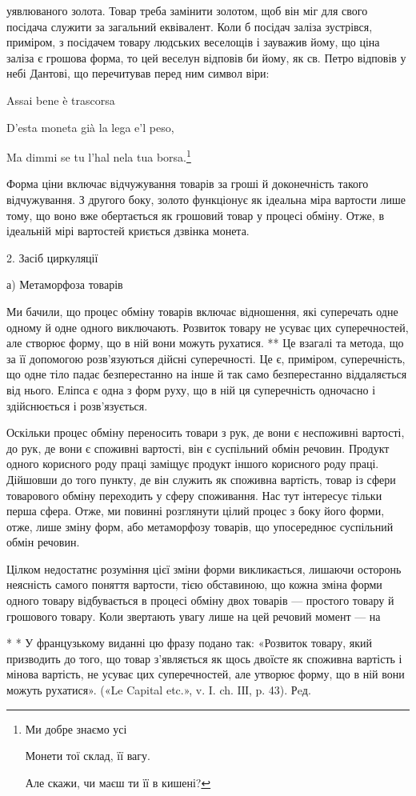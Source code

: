 уявлюваного золота. Товар треба замінити золотом, щоб він міг
для свого посідача служити за загальний еквівалент. Коли б
посідач заліза зустрівся, приміром, з посідачем товару людських
веселощів і зауважив йому, що ціна заліза є грошова форма,
то цей веселун відповів би йому, як св. Петро відповів у небі
Дантові, що перечитував перед ним символ віри:

Assai bene è trascorsa

D’esta moneta già la lega e’l peso,

Ma dimmi se tu l’hal nela tua borsa.\footnote*{
Ми добре знаємо усі

Монети тої склад, її вагу.

Але скажи, чи маєш ти її в кишені?
}

Форма ціни включає відчужування товарів за гроші й доконечність
такого відчужування. З другого боку, золото функціонує
як ідеальна міра вартости лише тому, що воно вже обертається
як грошовий товар у процесі обміну. Отже, в ідеальній
мірі вартостей криється дзвінка монета.

2. Засіб циркуляції

а) Метаморфоза товарів

Ми бачили, що процес обміну товарів включає відношення,
які суперечать одне одному й одне одного виключають. Розвиток
товару не усуває цих суперечностей, але створює форму, що в
ній вони можуть рухатися. ** Це взагалі та метода, що за її допомогою
розв’язуються дійсні суперечності. Це є, приміром, суперечність,
що одне тіло падає безперестанно на інше й так само безперестанно
віддаляється від нього. Еліпса є одна з форм руху,
що в ній ця суперечність одночасно і здійснюється і розв’язується.

Оскільки процес обміну переносить товари з рук, де вони є
неспоживні вартості, до рук, де вони є споживні вартості, він
є суспільний обмін речовин. Продукт одного корисного роду
праці заміщує продукт іншого корисного роду праці. Дійшовши
до того пункту, де він служить як споживна вартість, товар
із сфери товарового обміну переходить у сферу споживання.
Нас тут інтересує тільки перша сфера. Отже, ми повинні розглянути
цілий процес з боку його форми, отже, лише зміну форм,
або метаморфозу товарів, що упосереднює суспільний обмін
речовин.

Цілком недостатнє розуміння цієї зміни форми викликається,
лишаючи осторонь неясність самого поняття вартости, тією обставиною,
що кожна зміна форми одного товару відбувається в
процесі обміну двох товарів — простого товару й грошового
товару. Коли звертають увагу лише на цей речовий момент — на

* * У французькому виданні цю фразу подано так: «Розвиток товару,
який призводить до того, що товар з’являється як щось двоїсте як споживна
вартість і мінова вартість, не усуває цих суперечностей, але утворює
форму, що в ній вони можуть рухатися». («Le Capital etc.», v. I. ch. IІІ,
p. 43). Рeд.
